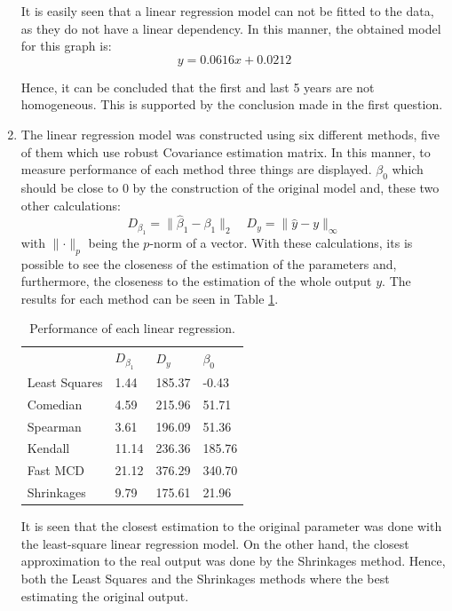 \documentclass[fleqn]{article}
\begin{document}
\begin{enumerate}[label=\alph*)]
    It is easily seen that a linear regression model can not be fitted to the
    data, as they do not have a linear dependency. In this manner, the obtained
    model for this graph is:
    \[
      y = 0.0616x + 0.0212
    \]

    Hence, it can be concluded that the first and last 5 years are not
    homogeneous. This is supported by the conclusion made in the first question.

  \item The linear regression model was constructed using six different methods,
    five of them which use robust Covariance estimation matrix. In this manner,
    to measure performance of each method three things are displayed.
    $\beta_{0}$ which should be close to 0 by the construction of the original
    model and, these two other calculations:
    \[
      D_{\beta_{1}} = \lVert \hat{\beta}_{1} - \beta_{1} \rVert_{2} \quad
      D_{y} = \lVert \hat{y} - y \rVert_{\infty}
    \]
    with $\lVert \cdot \rVert_{p}$ being the $p$-norm of a vector. With these
    calculations, its is possible to see the closeness of the estimation of the
    parameters and, furthermore, the closeness to the estimation of the whole
    output $y$. The results for each method can be seen in Table \ref{tab:lrp}.
    \begin{table}[H]
      \centering
      \begin{tabular}{llll}
        \hline
        & $D_{\beta_1}$ & $D_y$  & $\beta_0$ \\
        Least Squares & 1.44          & 185.37 & -0.43     \\
        Comedian      & 4.59          & 215.96 & 51.71     \\
        Spearman      & 3.61          & 196.09 & 51.36     \\
        Kendall       & 11.14         & 236.36 & 185.76    \\
        Fast MCD      & 21.12         & 376.29 & 340.70    \\
        Shrinkages    & 9.79          & 175.61 & 21.96     \\ \hline
      \end{tabular}
      \caption{Performance of each linear regression.}
      \label{tab:lrp}
    \end{table}

    It is seen that the closest estimation to the original parameter was done
    with the least-square linear regression model. On the other hand, the
    closest approximation to the real output was done by the Shrinkages method.
    Hence, both the Least Squares and the Shrinkages methods where the best
    estimating the original output.
\end{enumerate}
\end{document}
